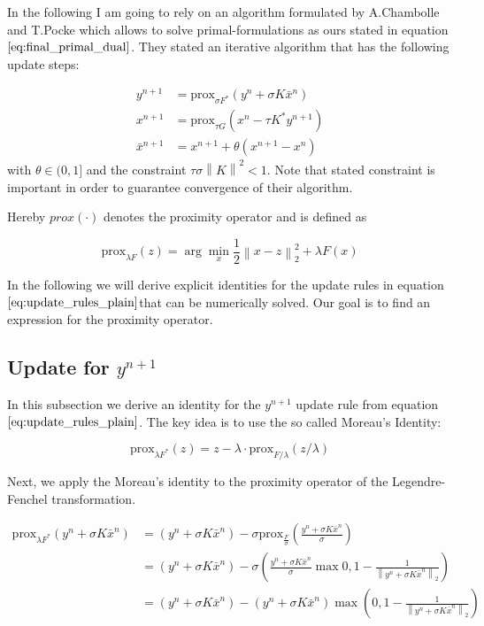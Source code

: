 \documentclass{paper}
\newcommand{\prox}{\text{prox}}
\newcommand{\twonorm}[1]{\left\lVert#1\right\rVert_2}
\newcommand{\norm}[1]{\left\lVert#1\right\rVert}
\begin{document}
In the following I am going to rely on an algorithm formulated by A.Chambolle and T.Pocke which allows to solve primal-formulations as ours stated in equation $\ref{eq:final_primal_dual}$.
They stated an iterative algorithm that has the following update steps:

\begin{align}
	y^{n+1} &= \prox_{\sigma F^*}(y^n + \sigma K \bar{x}^n) \nonumber \\
	x^{n+1} &= \prox_{\tau G}(x^n - \tau K^* y^{n+1}) \\
	\bar{x}^{n+1} &= x^{n+1} + \theta(x^{n+1} - x^n)
\label{eq:update_rules_plain}	
\end{align}
with $\theta \in (0, 1]$ and the constraint $\tau \sigma \norm{K}^2 < 1$. Note that stated constraint is important in order to guarantee convergence of their algorithm.

Hereby $prox(\cdot)$ denotes the proximity operator and is defined as 

\begin{equation}
	\prox_{\lambda F}(z) = \arg \min_x \frac{1}{2} \twonorm{x - z}^2 + \lambda F(x)
\end{equation}

In the following we will derive explicit identities for the update rules in equation $\ref{eq:update_rules_plain}$that can be numerically solved. Our goal is to find an expression for the proximity operator.

\subsection{Update for $y^{n+1}$}

In this subsection we derive an identity for the $y^{n+1}$ update rule from equation $\ref{eq:update_rules_plain}$. The key idea is to use the so called Moreau's Identity:  

\begin{equation}
	\prox_{\lambda F^*}(z) = z - \lambda \cdot \prox_{F/ \lambda}(z / \lambda) 
\label{eq:moreau}	
\end{equation}

Next, we apply the Moreau's identity to the proximity operator of the Legendre-Fenchel transformation.


\begin{align}
	\prox_{\lambda F^*}(y^n + \sigma K \bar{x}^{n}) 
	&= (y^n + \sigma K \bar{x}^{n}) - \sigma \prox_{\frac{F}{\sigma} } \left(\frac{y^n + \sigma K \bar{x}^{n} }{\sigma} \right) \nonumber \\
	&= (y^n + \sigma K \bar{x}^{n}) - \sigma \left( \frac{y^n + \sigma K \bar{x}^{n} }{\sigma} \max{0, 1-\frac{1}{\twonorm{y^n + \sigma K \bar{x}^{n} }}} \right) \nonumber \\
	&= (y^n + \sigma K \bar{x}^{n}) - \left( y^n + \sigma K \bar{x}^{n} \right) \max{\left(0, 1-\frac{1}{\twonorm{y^n + \sigma K \bar{x}^{n} }}\right)}  
\label{eq:y_n_1_expression}
\end{align}
\end{document}
